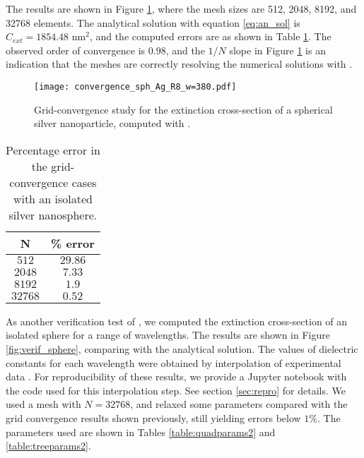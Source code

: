 The results are shown in Figure \ref{fig:error_sphere_Ag}, where the mesh sizes are
512, 2048, 8192, and 32768 elements. 
The analytical solution with equation \eqref{eq:an_sol} is $C_{ext} = 1854.48$ nm$^2$, 
and the computed errors are as shown in Table \ref{table:err_iso_sphere}.
The observed order of convergence is $0.98$, and the $1/N$ slope in Figure \ref{fig:error_sphere_Ag}
is an indication that the meshes are correctly resolving the numerical solutions with \pygbe. 


\begin{figure}[h] %
   \centering
   \texttt{[image: convergence\_sph\_Ag\_R8\_w=380.pdf]} 
   \caption{Grid-convergence study for the extinction cross-section of a spherical silver
            nanoparticle, computed with \pygbe.}
   \label{fig:error_sphere_Ag}
\end{figure}



\begin{table}[h]
    \centering
    \caption{\label{table:err_iso_sphere} Percentage error in the grid-convergence cases with an isolated silver nanosphere.} 
    \begin{tabular}{c c}
    \hline%
    N & \% error \\
    \hline%
     $512$ & $29.86$ \\
     $2048$ & $7.33$ \\
     $8192$ & $1.9$ \\
     $32768$ & $0.52$ \\
    \hline%
    \end{tabular}
\end{table}

As another verification test of \pygbe, we computed the extinction cross-section of an 
isolated sphere for a range of wavelengths. 
The results are shown in Figure \ref{fig:verif_sphere}, comparing with the analytical solution. 
The values of dielectric constants for each wavelength were obtained by interpolation of 
experimental data \cite{JohnsonChristy1972, HaleQuerry1972}.
For reproducibility of these results, we provide a Jupyter notebook with the code used for this interpolation step.
See section \ref{sec:repro} for details.
We used a mesh with $N=32768$, and relaxed some parameters compared with the grid convergence results shown previously, still yielding errors below $1\%$.
The parameters used are shown in Tables \ref{table:quadparams2} and \ref{table:treeparams2}.



